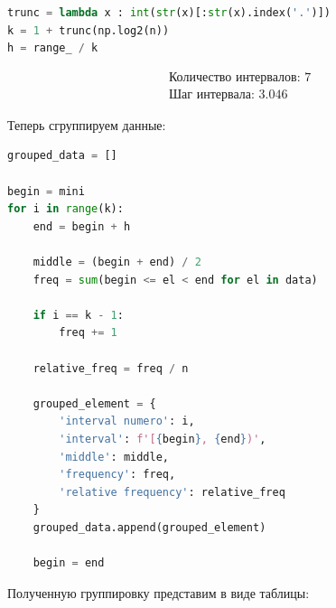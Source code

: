 \documentclass[a4paper, 14pt]{extarticle}
\begin{document}
\begin{center}
  \begin{lstlisting}[language=Python]
trunc = lambda x : int(str(x)[:str(x).index('.')])
k = 1 + trunc(np.log2(n))
h = range_ / k
  \end{lstlisting}
\end{center}

\vspace{-5pt}

\begin{align*}
    & \text{Количество интервалов: } 7 \\
    & \text{Шаг интервала: }  3.046
\end{align*}

Теперь сгруппируем данные:

\vspace{10pt}

\begin{center}
  \begin{lstlisting}[language=Python]
grouped_data = []

begin = mini
for i in range(k):
    end = begin + h

    middle = (begin + end) / 2
    freq = sum(begin <= el < end for el in data)
    
    if i == k - 1:
        freq += 1

    relative_freq = freq / n

    grouped_element = {
        'interval numero': i,
        'interval': f'[{begin}, {end})',
        'middle': middle,
        'frequency': freq,
        'relative frequency': relative_freq
    }
    grouped_data.append(grouped_element)

    begin = end
  \end{lstlisting}
\end{center}
\vspace{10pt}
Полученную группировку представим в виде таблицы:

\vfill
\end{document}
